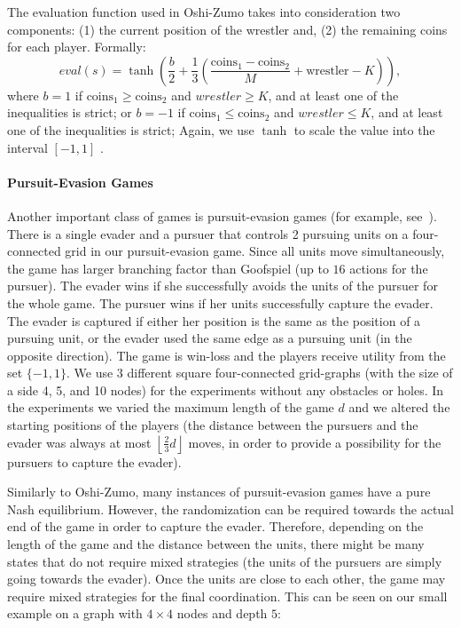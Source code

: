\vspace{0.1cm}

The evaluation function used in Oshi-Zumo takes into consideration two components: (1) the current position of the wrestler and, (2) the remaining coins for each player. Formally:
$$
eval(s) = \tanh\left(\frac{b}{2}+\frac{1}{3}\left(\frac{\textrm{coins}_1 - \textrm{coins}_2}{M} + \textrm{wrestler} - K\right)\right),
$$
where $b = 1$ if $\textrm{coins}_1 \geq \textrm{coins}_2$ and $wrestler \geq K$, and at least one of the inequalities is strict;
or $b = -1$ if $\textrm{coins}_1 \leq \textrm{coins}_2$ and $wrestler \leq K$, and at least one of the inequalities is strict;
Again, we use $\tanh$ to scale the value into the interval $[-1,1]$ .

\paragraph{\textbf{Pursuit-Evasion Games}}

Another important class of games is pursuit-evasion games (for example, see~\cite{nguyen2013monte}).
There is a single evader and a pursuer that controls 2 pursuing units on a four-connected grid in our pursuit-evasion game.
Since all units move simultaneously, the game has larger branching factor than Goofspiel (up to $16$ actions for the pursuer).
The evader wins if she successfully avoids the units of the pursuer for the whole game.
The pursuer wins if her units successfully capture the evader. 
The evader is captured if either her position is the same as the position of a pursuing unit, or the evader used the same edge as a pursuing unit (in the opposite direction).
The game is win-loss and the players receive utility from the set $\lbrace -1, 1 \rbrace$.
We use $3$ different square four-connected grid-graphs (with the size of a side 4, 5, and 10 nodes) for the experiments without any obstacles or holes.
In the experiments we varied the maximum length of the game $d$ and we altered the starting positions of the players 
(the distance between the pursuers and the evader was always at most $\left\lfloor\frac{2}{3} d\right\rfloor$ moves, in order to provide a 
possibility for the pursuers to capture the evader).

Similarly to Oshi-Zumo, many instances of pursuit-evasion games have a pure Nash equilibrium.
However, the randomization can be required towards the actual end of the game in order to capture the evader.
Therefore, depending on the length of the game and the distance between the units, there might be many states that do not require mixed
strategies (the units of the pursuers are simply going towards the evader).
Once the units are close to each other, the game may require mixed strategies for the final coordination.
This can be seen on our small example on a graph with $4\times4$ nodes and depth $5$:

